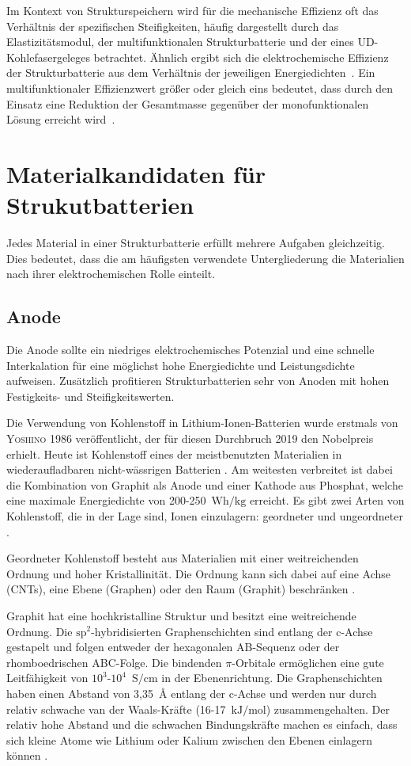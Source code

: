 Im Kontext von Strukturspeichern wird für die mechanische Effizienz oft das Verhältnis der spezifischen Steifigkeiten, häufig dargestellt durch das Elastizitätsmodul, der multifunktionalen Strukturbatterie und der eines UD-Kohlefasergeleges betrachtet. Ähnlich ergibt sich die elektrochemische Effizienz der Strukturbatterie aus dem Verhältnis der jeweiligen Energiedichten~\cite{Sha2021}. Ein multifunktionaler Effizienzwert größer oder gleich eins bedeutet, dass durch den Einsatz eine Reduktion der Gesamtmasse gegenüber der monofunktionalen Lösung erreicht wird~\cite{Snyder2015}.

\section{Materialkandidaten für Strukutbatterien}

Jedes Material in einer Strukturbatterie erfüllt mehrere Aufgaben gleichzeitig. Dies bedeutet, dass 
die am häufigsten verwendete Untergliederung die Materialien nach ihrer elektrochemischen Rolle einteilt.


\subsection{Anode}
Die Anode sollte ein niedriges elektrochemisches Potenzial und eine schnelle Interkalation für eine möglichst hohe Energiedichte und Leistungsdichte aufweisen. Zusätzlich profitieren Strukturbatterien sehr von Anoden mit hohen Festigkeits- und Steifigkeitswerten.

Die Verwendung von Kohlenstoff in Lithium-Ionen-Batterien wurde erstmals von \textsc{Yoshino} \cite{Yoshino1986} 1986 veröffentlicht, der für diesen Durchbruch 2019 den Nobelpreis erhielt.
Heute ist Kohlenstoff eines der meistbenutzten Materialien in wiederaufladbaren nicht-wässrigen Batterien \cite{Ahmad2021}. Am weitesten verbreitet ist dabei die Kombination von Graphit als Anode und einer Kathode aus Phosphat, welche eine maximale Energiedichte von 200-250~$\si{\watt \hour \per \kg}$ erreicht. 
Es gibt zwei Arten von Kohlenstoff, die in der Lage sind, Ionen einzulagern: geordneter und ungeordneter \cite{Ghosh2024}.

Geordneter Kohlenstoff besteht aus Materialien mit einer weitreichenden Ordnung und hoher Kristallinität. Die Ordnung kann sich dabei auf eine Achse (CNTs), eine Ebene (Graphen) oder den Raum (Graphit) beschränken \cite{Wang2021}.

Graphit hat eine hochkristalline Struktur und besitzt eine weitreichende Ordnung. Die $\text{sp}^\text{2}$-hybridisierten Graphenschichten sind entlang der c-Achse gestapelt und folgen entweder der hexagonalen AB-Sequenz oder der rhomboedrischen ABC-Folge. Die bindenden $\pi$-Orbitale ermöglichen eine gute Leitfähigkeit von $10^3$-$10^4$~$\si{\siemens \per \cm}$ in der Ebenenrichtung. Die Graphenschichten haben einen Abstand von 3,35~$\si{\angstrom}$ entlang der c-Achse und werden nur durch relativ schwache van der Waals-Kräfte (16-17~$\si{\kJ \per \mol}$) zusammengehalten. Der relativ hohe Abstand und die schwachen Bindungskräfte machen es einfach, dass sich kleine Atome wie Lithium oder Kalium zwischen den Ebenen einlagern können \cite{Wang2021}.

